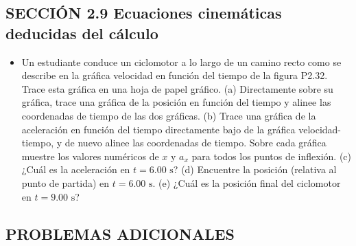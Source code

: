 \documentclass[11pt,a4paper]{article}
\begin{document}
\newpage

\subsection*{SECCIÓN 2.9 Ecuaciones cinemáticas deducidas del cálculo}

\begin{itemize}
    \item[\textbf{32.}] Un estudiante conduce un ciclomotor a lo largo de un camino recto como se describe en la gráfica velocidad en función del tiempo de la figura P2.32. Trace esta gráfica en una hoja de papel gráfico. (a) Directamente sobre su gráfica, trace una gráfica de la posición en función del tiempo y alinee las coordenadas de tiempo de las dos gráficas. (b) Trace una gráfica de la aceleración en función del tiempo directamente bajo de la gráfica velocidad-tiempo, y de nuevo alinee las coordenadas de tiempo. Sobre cada gráfica muestre los valores numéricos de $x$ y $a_x$ para todos los puntos de inflexión. (c) ¿Cuál es la aceleración en $t = 6.00 \text{ s}$? (d) Encuentre la posición (relativa al punto de partida) en $t = 6.00 \text{ s}$. (e) ¿Cuál es la posición final del ciclomotor en $t = 9.00 \text{ s}$?
    \vspace*{10cm}
\end{itemize}

\newpage

\subsection*{PROBLEMAS ADICIONALES}
\end{document}
